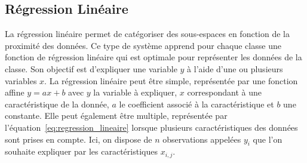 %
%

\subsection{Régression Linéaire}
La régression linéaire permet de catégoriser des sous-espaces en fonction de la proximité des données. %
Ce type de système apprend pour chaque classe une fonction de régression linéaire qui est optimale pour représenter les données de la classe. Son objectif est d'expliquer une variable $y$ à l'aide d'une ou plusieurs variables $x$. La régression linéaire peut être simple, représentée par une fonction affine $y=ax+b$ avec $y$ la variable à expliquer, $x$ correspondant à une caractéristique de la donnée, $a$ le coefficient associé à la caractéristique et $b$ une constante.
Elle peut également être multiple, représentée par l'équation~\ref{eq:regression_lineaire} lorsque plusieurs caractéristiques des données sont prises en compte. Ici, on dispose de $n$ observations appelées $y_i$ que l'on souhaite expliquer par les caractéristiques $x_{i,j}$.

